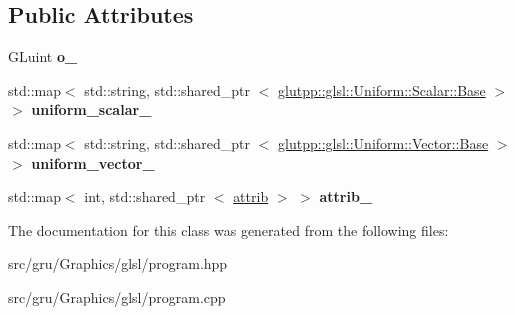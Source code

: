 \subsection*{\-Public \-Attributes}
\begin{DoxyCompactItemize}
\item 
\hypertarget{classglutpp_1_1glsl_1_1program_ac72cb1de967afd0617edf350dfa80dfd}{\-G\-Luint {\bfseries o\-\_\-}}\label{classglutpp_1_1glsl_1_1program_ac72cb1de967afd0617edf350dfa80dfd}

\item 
\hypertarget{classglutpp_1_1glsl_1_1program_ad49f6361ebe16617065fdce1ea2e1c57}{std\-::map$<$ std\-::string, \*
std\-::shared\-\_\-ptr\*
$<$ \hyperlink{classglutpp_1_1glsl_1_1Uniform_1_1Scalar_1_1Base}{glutpp\-::glsl\-::\-Uniform\-::\-Scalar\-::\-Base} $>$ $>$ {\bfseries uniform\-\_\-scalar\-\_\-}}\label{classglutpp_1_1glsl_1_1program_ad49f6361ebe16617065fdce1ea2e1c57}

\item 
\hypertarget{classglutpp_1_1glsl_1_1program_a391deb5c96ae54df3c26f2e446fe71f1}{std\-::map$<$ std\-::string, \*
std\-::shared\-\_\-ptr\*
$<$ \hyperlink{classglutpp_1_1glsl_1_1Uniform_1_1Vector_1_1Base}{glutpp\-::glsl\-::\-Uniform\-::\-Vector\-::\-Base} $>$ $>$ {\bfseries uniform\-\_\-vector\-\_\-}}\label{classglutpp_1_1glsl_1_1program_a391deb5c96ae54df3c26f2e446fe71f1}

\item 
\hypertarget{classglutpp_1_1glsl_1_1program_af8419390e2c2ba623c2a711568a7bdab}{std\-::map$<$ int, std\-::shared\-\_\-ptr\*
$<$ \hyperlink{classglutpp_1_1glsl_1_1attrib}{attrib} $>$ $>$ {\bfseries attrib\-\_\-}}\label{classglutpp_1_1glsl_1_1program_af8419390e2c2ba623c2a711568a7bdab}

\end{DoxyCompactItemize}


\-The documentation for this class was generated from the following files\-:\begin{DoxyCompactItemize}
\item 
src/gru/\-Graphics/glsl/program.\-hpp\item 
src/gru/\-Graphics/glsl/program.\-cpp\end{DoxyCompactItemize}

